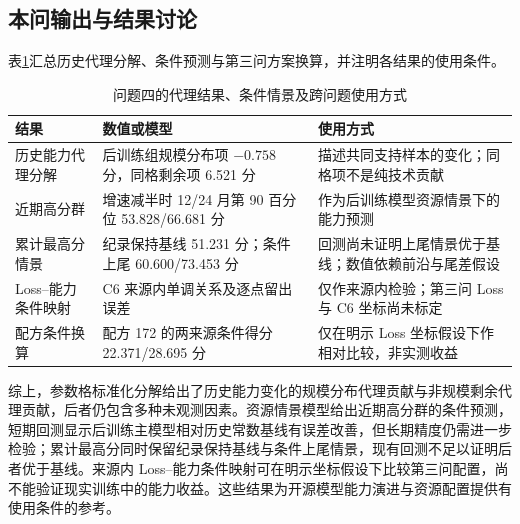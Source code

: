 \subsection{本问输出与结果讨论}

表\ref{tab:q4-output}汇总历史代理分解、条件预测与第三问方案换算，并注明各结果的使用条件。

\begin{table}[htbp]
 \centering\small
 \caption{问题四的代理结果、条件情景及跨问题使用方式}
 \label{tab:q4-output}
 \begin{tabular}{p{2.5cm}p{4.2cm}p{5.8cm}}
 \toprule
 结果 & 数值或模型 & 使用方式\\
 \midrule
 历史能力代理分解 & 后训练组规模分布项 $-0.758$ 分，同格剩余项 6.521 分 & 描述共同支持样本的变化；同格项不是纯技术贡献\\
 近期高分群 & 增速减半时 12/24 月第 90 百分位 53.828/66.681 分 & 作为后训练模型资源情景下的能力预测\\
 累计最高分情景 & 纪录保持基线 51.231 分；条件上尾 60.600/73.453 分 & 回测尚未证明上尾情景优于基线；数值依赖前沿与尾差假设\\
 Loss--能力条件映射 & C6 来源内单调关系及逐点留出误差 & 仅作来源内检验；第三问 Loss 与 C6 坐标尚未标定\\
 配方条件换算 & 配方 172 的两来源条件得分 22.371/28.695 分 & 仅在明示 Loss 坐标假设下作相对比较，非实测收益\\
 \bottomrule
 \end{tabular}
\end{table}

综上，参数格标准化分解给出了历史能力变化的规模分布代理贡献与非规模剩余代理贡献，后者仍包含多种未观测因素。资源情景模型给出近期高分群的条件预测，短期回测显示后训练主模型相对历史常数基线有误差改善，但长期精度仍需进一步检验；累计最高分同时保留纪录保持基线与条件上尾情景，现有回测不足以证明后者优于基线。来源内 Loss--能力条件映射可在明示坐标假设下比较第三问配置，尚不能验证现实训练中的能力收益。这些结果为开源模型能力演进与资源配置提供有使用条件的参考。
